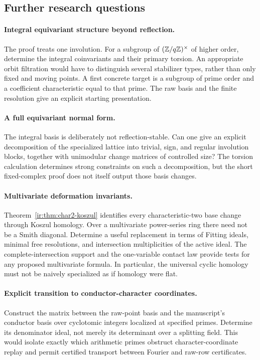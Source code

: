 \subsection{Further research questions}
\paragraph{Integral equivariant structure beyond reflection.}
The proof treats one involution. For a subgroup of $(\mathbb Z/q\mathbb Z)^\times$
of higher order, determine the integral coinvariants and their primary
torsion. An appropriate orbit filtration would have to distinguish
several stabilizer types, rather than only fixed and moving points.
A first concrete target is a subgroup of prime order and a coefficient
characteristic equal to that prime. The raw basis and the finite
resolution give an explicit starting presentation.

\paragraph{A full equivariant normal form.}
The integral basis is deliberately not reflection-stable. Can one give
an explicit decomposition of the specialized lattice into trivial,
sign, and regular involution blocks, together with unimodular change
matrices of controlled size? The torsion calculation determines strong
constraints on such a decomposition, but the short fixed-complex proof
does not itself output those basis changes.

\paragraph{Multivariate deformation invariants.}
Theorem~\ref{ir:thm:char2-koszul} identifies every characteristic-two
base change through Koszul homology. Over a multivariate power-series
ring there need not be a Smith diagonal. Determine a useful replacement
in terms of Fitting ideals, minimal free resolutions, and intersection
multiplicities of the active ideal. The complete-intersection support
and the one-variable contact law provide tests for any proposed
multivariate formula. In particular, the universal cyclic homology
must not be naively specialized as if homology were flat.

\paragraph{Explicit transition to conductor-character coordinates.}
Construct the matrix between the raw-point basis and the manuscript's
conductor basis over cyclotomic integers localized at specified primes.
Determine its denominator ideal, not merely its determinant over a
splitting field. This would isolate exactly which arithmetic primes
obstruct character-coordinate replay and permit certified transport
between Fourier and raw-row certificates.


